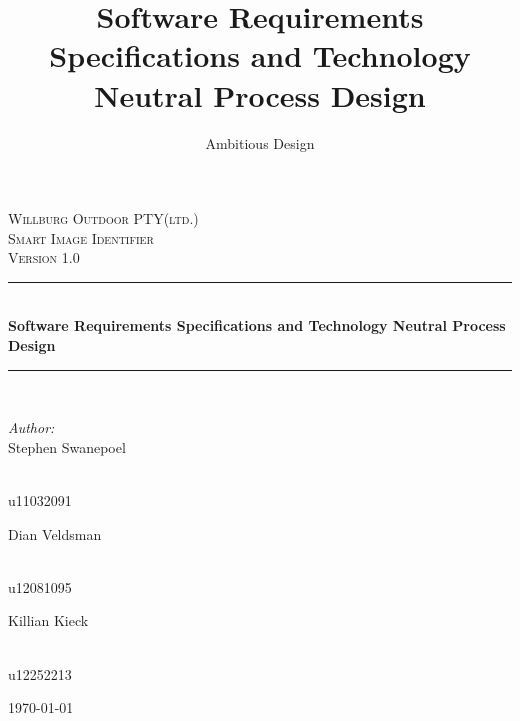 \documentclass[a4paper,12pt]{report}
\author{Ambitious Design}
\title{ Software Requirements Specifications and Technology Neutral Process Design}
\newcommand{\HRule}{\rule{\linewidth}{0.5mm}}
\begin{document}
\setlength{\parskip}{6pt}

\begin{titlepage}

\begin{center}
\textsc{\LARGE Willburg Outdoor PTY(ltd.)}\\[1.5cm]
\textsc{\Large Smart Image Identifier }\\[1.0cm]
\textsc{\Large Version 1.0 }\\[0.5cm]
\HRule \\[0.4cm]
{ \huge \bfseries  Software Requirements Specifications and Technology Neutral Process Design}\\[0.4cm]
\HRule \\[0.4cm]
\begin{minipage}{0.4\textwidth}
\begin{flushleft} \large
\emph{Author:}\\
Stephen {Swanepoel}
\end{flushleft}
\end{minipage}
\begin{minipage}{0.4\textwidth}
\begin{flushright} \large
\emph{} \\
u11032091
\end{flushright}
\end{minipage}
\begin{minipage}{0.4\textwidth}
\begin{flushleft} \large
Dian {Veldsman}
\end{flushleft}
\end{minipage}
\begin{minipage}{0.4\textwidth}
\begin{flushright} \large
\emph{} \\
u12081095
\end{flushright}
\end{minipage}
\begin{minipage}{0.4\textwidth}
\begin{flushleft} \large
Killian {Kieck}
\end{flushleft}
\end{minipage}
\begin{minipage}{0.4\textwidth}
\begin{flushright} \large
\emph{} \\
u12252213
\end{flushright}
\end{minipage}


{\large \today}
\end{center}
\end{titlepage}
\footnotesize
\normalsize
\end{document}

